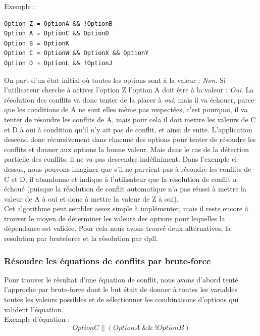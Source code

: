 \documentclass[17pts]{report}
\begin{document}
Exemple :
\begin{verbatim}
Option Z = OptionA && !OptionB
Option A = OptionC && OptionD
Option B = OptionK
Option C = OptionW && OptionX && OptionY
Option D = OptionL && !OptionJ
\end{verbatim}

On part d'un état initial où toutes les options sont à la valeur :
\textit{Non}.  Si l'utilisateur cherche à activer l'option Z l'option A doit
être à la valeur : \textit{Oui}. La résolution des conflits va donc tenter de
la placer à \textit{oui}, mais il va échouer, parce que les conditions de A ne
sont elles même pas respectées, c'est pourquoi, il va tenter de résoudre les
conflits de A, mais pour cela il doit mettre les valeurs de C et D à oui à
condition qu'il n'y ait pas de conflit, et ainsi de suite.  L'application
descend donc récursivement dans chacune des options pour tenter de résoudre les
conflits et donner aux options la bonne valeur. Mais dans le cas de la
détection partielle des conflits, il ne va pas descendre indéfiniment. Dans
l'exemple ci-dessus, nous pouvons imaginer que s'il ne parvient pas à résoudre
les conflits de C et D, il abandonne et indique à l'utilisateur que la
résolution de conflit a échoué (puisque la résolution de conflit automatique
n'a pas réussi à mettre la valeur de A à oui et donc à mettre la valeur de Z à
oui).  \\

Cet algorithme peut sembler assez simple à implémenter, mais il reste encore à
trouver le moyen de déterminer les valeurs des options pour lequelles la
dépendance est validée. Pour cela nous avons trouvé deux altérnatives, la
resolution par bruteforce et la résolution par dpll.


\subsubsection{Résoudre les équations de conflits par brute-force}
\label{ssub:Résoudre les équations de conflits par brute-force}
Pour trouver le résultat d'une équation de conflit, nous avons d'abord tenté
l'approche par brute-force dont le but était de donner à toutes les variables
toutes les valeurs possibles et de sélectionner les combinaisons d'options qui
valident l'équation.  \\

Exemple d'équation :
\begin{equation}
OptionC\;||\;(OptionA\;\&\&\;!OptionB)
\end{equation}
\end{document}
